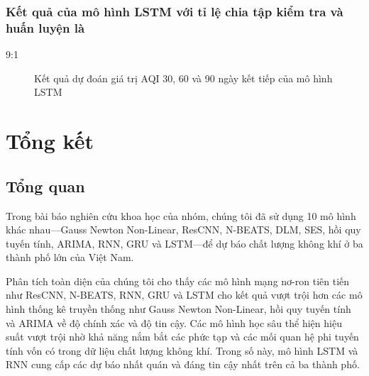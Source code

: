 \documentclass[conference]{IEEEtran}
\begin{document}
\subsubsection{Kết quả của mô hình LSTM với tỉ lệ chia tập kiểm tra và huấn luyện là}
9:1
\begin{figure}[htbp]
    \centering
    \hspace{0.01\textwidth}
    \hspace{0.01\textwidth}
    \caption{Kết quả dự đoán giá trị AQI 30, 60 và 90 ngày kết tiếp của mô hình LSTM}
    \label{fig
    }
\end{figure}

\section{Tổng kết}
\subsection{Tổng quan}
Trong bài báo nghiên cứu khoa học của nhóm, chúng tôi đã sử dụng 10 mô hình khác nhau—Gauss Newton Non-Linear, ResCNN, N-BEATS, DLM, SES, hồi quy tuyến tính, ARIMA, RNN, GRU và LSTM—để dự báo chất lượng không khí ở ba thành phố lớn của Việt Nam.

Phân tích toàn diện của chúng tôi cho thấy các mô hình mạng nơ-ron tiên tiến như ResCNN, N-BEATS, RNN, GRU và LSTM cho kết quả vượt trội hơn các mô hình thống kê truyền thống như Gauss Newton Non-Linear, hồi quy tuyến tính và ARIMA về độ chính xác và độ tin cậy. Các mô hình học sâu thể hiện hiệu suất vượt trội nhờ khả năng nắm bắt các phức tạp và các mối quan hệ phi tuyến tính vốn có trong dữ liệu chất lượng không khí. Trong số này, mô hình LSTM và RNN cung cấp các dự báo nhất quán và đáng tin cậy nhất trên cả ba thành phố.
\end{document}
